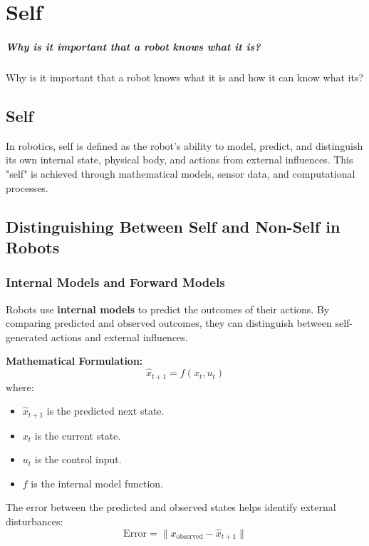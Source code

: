 \chapter{Self}



\paragraph{Why is it important that a robot knows what it is?}
    Why is it important that a robot knows what it is and how it can know what its?

\section{Self}
In robotics, self is defined as the robot's ability to model, predict, and distinguish its own internal state, physical body, and actions from external influences. This "self" is achieved through mathematical models, sensor data, and computational processes.


\section{Distinguishing Between Self and Non-Self in Robots}

\subsection{Internal Models and Forward Models}
Robots use \textbf{internal models} to predict the outcomes of their actions. By comparing predicted and observed outcomes, they can distinguish between self-generated actions and external influences.

\textbf{Mathematical Formulation:}
\begin{equation}
    \hat{x}_{t+1} = f(x_t, u_t)
\end{equation}
where:
\begin{itemize}
    \item \( \hat{x}_{t+1} \) is the predicted next state.
    \item \( x_t \) is the current state.
    \item \( u_t \) is the control input.
    \item \( f \) is the internal model function.
\end{itemize}
The error between the predicted and observed states helps identify external disturbances:
\begin{equation}
    \text{Error} = \| x_{\text{observed}} - \hat{x}_{t+1} \|
\end{equation}

